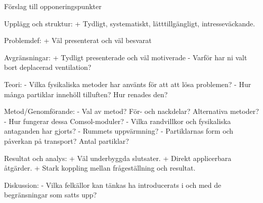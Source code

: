 Förslag till opponeringspunkter

Upplägg och struktur:
	+ Tydligt, systematiskt, lätttillgängligt, intresseväckande.

Problemdef:
	+ Väl presenterat och väl besvarat

Avgränsningar:
	+ Tydligt presenterade och väl motiverade
	- Varför har ni valt bort deplacerad ventilation?

Teori:
	- Vilka fysikaliska metoder har använts för att att lösa problemen?
	- Hur många partiklar innehöll tilluften? Hur renades den?

Metod/Genomförande: 
	- Val av metod? För- och nackdelar? Alternativa metoder?
	- Hur fungerar dessa Comsol-moduler?
	- Vilka randvillkor och fysikaliska antaganden har gjorts?
	- Rummets uppvärmning?
	- Partiklarnas form och påverkan på transport? Antal partiklar?

Resultat och analys:
	+ Väl underbyggda slutsater.
	+ Direkt applicerbara åtgärder.
	+ Stark koppling mellan frågeställning och resultat.

Diskussion:
	- Vilka felkällor kan tänkas ha introducerats i och med de begränsningar som 	satts upp?

